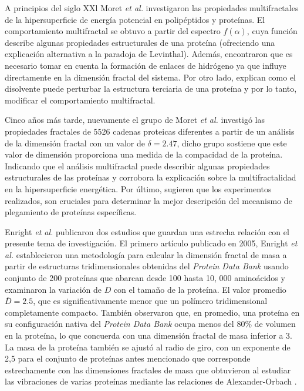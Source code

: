 A principios del siglo XXl Moret \textit{et al.}\cite{Moret2001} investigaron las propiedades multifractales de la hipersuperficie de energ\'{i}a potencial en polip\'{e}ptidos y prote\'{i}nas. El comportamiento multifractal se obtuvo a partir del espectro $f(\alpha)$, cuya funci\'{o}n describe algunas propiedades estructurales de una prote\'{i}na (ofreciendo una explicaci\'{o}n alternativa a la paradoja de Levinthal). Adem\'{a}s, encontraron que es necesario tomar en cuenta la formaci\'{o}n de enlaces de hidr\'{o}geno ya que influye directamente en la dimensi\'{o}n fractal del sistema. Por otro lado, explican como el disolvente puede perturbar la estructura terciaria de una prote\'{i}na y por lo tanto, modificar el comportamiento multifractal.

Cinco años m\'{a}s tarde, nuevamente el grupo de Moret \textit{et al.} \cite{Moret2005} investig\'{o} las propiedades fractales de 5526 cadenas proteicas diferentes a partir de un an\'{a}lisis de la dimensi\'{o}n fractal con un valor de $\delta = 2.47$, dicho grupo sostiene que este valor de dimensi\'{o}n proporciona una medida de la compacidad de la prote\'{i}na. Indicando que el an\'{a}lisis multifractal puede describir algunas propiedades estructurales de las prote\'{i}nas y corrobora la explicaci\'{o}n sobre la multifractalidad en la hipersuperficie energ\'{e}tica. Por \'{u}ltimo, sugieren que los experimentos realizados, son cruciales para determinar la mejor descripci\'{o}n del mecanismo de plegamiento de prote\'{i}nas espec\'{i}ficas.

Enright \textit{et al.} publicaron dos estudios que guardan una estrecha relaci\'{o}n con el presente tema de investigaci\'{o}n. El primero art\'{i}culo publicado en 2005, Enright \textit{et al.}
\cite{Enright2005} establecieron una metodolog\'{i}a  para calcular la dimensi\'{o}n fractal de masa a partir de estructuras tridimensionales obtenidas del \textit{Protein Data Bank} usando conjunto de 200 prote\'{i}nas que abarcan desde 100 hasta 10, 000 amino\'{a}cidos y examinaron la variaci\'{o}n de $D$ con el tamaño de la prote\'{i}na. El valor promedio $\bar{D} = 2.5$, que es significativamente menor que un pol\'{i}mero tridimensional completamente compacto. Tambi\'{e}n observaron que, en promedio, una prote\'{i}na en su configuraci\'{o}n nativa del \textit{Protein Data Bank} ocupa menos del $80\%$ de volumen en la prote\'{i}na, lo que concuerda con una dimensi\'{o}n fractal de masa inferior a 3. La masa de la prote\'{i}na tambi\'{e}n se ajust\'{o} al radio de giro, con un exponente de 2,5 para el conjunto de prote\'{i}nas antes mencionado que corresponde estrechamente con las dimensiones fractales de masa que obtuvieron al estudiar las vibraciones de varias prote\'{i}nas mediante las relaciones de Alexander-Orbach \cite{Alexander1982}.
 
